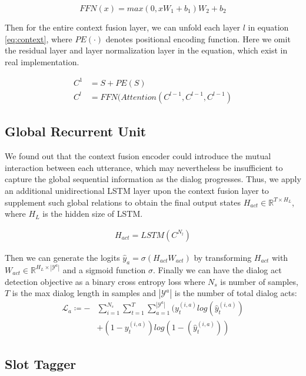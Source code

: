 \documentclass[a4paper]{article}
\begin{document}
\begin{equation}
    FFN(x) = max(0,xW_1 + b_1)W_2 + b_2
    \label{eq:attention}
\end{equation}

Then for the entire context fusion layer, we can unfold each layer $l$ in equation \ref{eq:context}, where $PE(\cdot)$ denotes positional encoding function. Here we omit the residual layer and layer normalization layer in the equation, which exist in real implementation.

\begin{align}
    C^1 &= S + PE(S) \\
    \label{eq:context}
    C^l &= FFN(Attention(C^{l-1}, C^{l-1}, C^{l-1})
\end{align}

\subsection{Global Recurrent Unit}

We found out that the context fusion encoder could introduce the mutual interaction between each utterance, which may nevertheless be insufficient to capture the global sequential information as the dialog progresses. 
Thus, we apply an additional unidirectional LSTM layer upon the context fusion layer to supplement such global relations to obtain the final output states $H_{act} \in \mathbb{R} ^{T \times H_L}$, where $H_L$ is the hidden size of LSTM.

\begin{align}
    H_{act} = LSTM(C^{N_l})
\end{align}

Then we can generate the logits $\hat{y}_a = \sigma(H_{act} W_{act})$ by transforming $H_{act}$ with $W_{act} \in \mathbb{R}^{H_L \times |\mathcal{Y}^a|}$ and a sigmoid function $\sigma$. Finally we can have the dialog act detection objective as a binary cross entropy loss where $N_s$ is number of samples, $T$ is the max dialog length in samples and $|\mathcal{Y}^a|$ is the number of total dialog acts:
\begin{align}
    \mathcal{L}_a \coloneqq - &\sum_{i=1}^{N_s}\sum_{t=1}^{T}\sum_{a=1}^{|\mathcal{Y}^a|} (y^{(i,a)}_t log (\hat{y}^{(i,a)}_t) \nonumber \\
    &+ (1-y^{(i,a)}_t) log (1-(\hat{y}^{(i,a)}_t)) 
\end{align}

\subsection{Slot Tagger}
\end{document}
